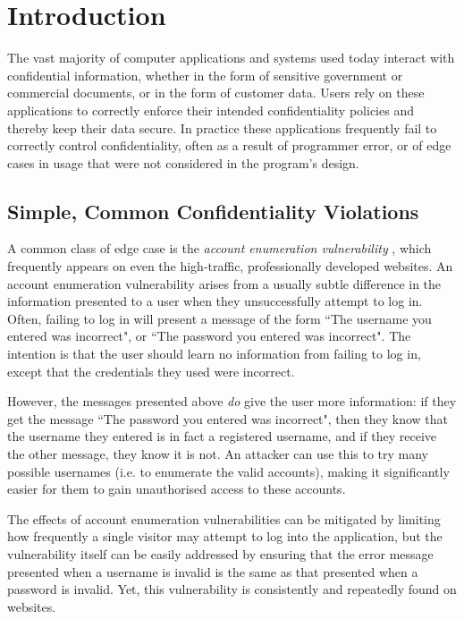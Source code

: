 \chapter{Introduction}

The vast majority of computer applications and systems used today interact with confidential information, whether in the form of sensitive government or commercial documents, or in the form of customer data. Users rely on these applications to correctly enforce their intended confidentiality policies and thereby keep their data secure. In practice these applications frequently fail to correctly control confidentiality, often as a result of programmer error, or of edge cases in usage that were not considered in the program's design.

\newpage

\section{Simple, Common Confidentiality Violations}

A common class of edge case is the \textit{account enumeration vulnerability} \cite{accountenumeration}, which frequently appears on even the high-traffic, professionally developed websites. An account enumeration vulnerability arises from a usually subtle difference in the information presented to a user when they unsuccessfully attempt to log in. Often, failing to log in will present a message of the form ``The username you entered was incorrect", or ``The password you entered was incorrect". The intention is that the user should learn no information from failing to log in, except that the credentials they used were incorrect.

However, the messages presented above \textit{do} give the user more information: if they get the message ``The password you entered was incorrect", then they know that the username they entered is in fact a registered username, and if they receive the other message, they know it is not. An attacker can use this to try many possible usernames (i.e. to enumerate the valid accounts), making it significantly easier for them to gain unauthorised access to these accounts.

The effects of account enumeration vulnerabilities can be mitigated by limiting how frequently a single visitor may attempt to log into the application, but the vulnerability itself can be easily addressed by ensuring that the error message presented when a username is invalid is the same as that presented when a password is invalid. Yet, this vulnerability is consistently and repeatedly found on websites.

